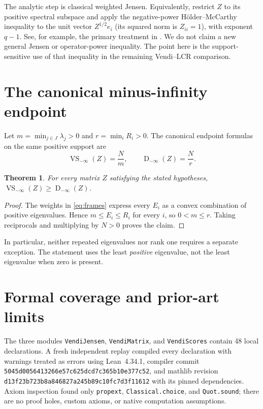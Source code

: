 \documentclass[11pt]{article}
\newtheorem{theorem}{Theorem}
\newcommand{\VS}{\operatorname{VS}}
\newcommand{\LCR}{\operatorname{D}}
\begin{document}
The analytic step is classical weighted Jensen. Equivalently, restrict
$Z$ to its positive spectral subspace and apply the negative-power
H\"older--McCarthy inequality to the unit vector $Z^{1/2}e_i$
(its squared norm is $Z_{ii}=1$), with exponent $q-1$.
See, for example, the primary treatment in \cite[Theorems~1--2]{Dragomir}.
We do not claim a new general Jensen or operator-power inequality.
The point here is the support-sensitive use of that inequality in the
remaining Vendi--LCR comparison.

\section{The canonical minus-infinity endpoint}
Let $m=\min_{j\in J}\lambda_j>0$ and $r=\min_i R_i>0$.
The canonical endpoint formulas on the same positive support are
\begin{equation}\label{eq:infinity}
 \VS_{-\infty}(Z)=\frac{N}{m},\qquad
 \LCR_{-\infty}(Z)=\frac{N}{r}.
\end{equation}
\begin{theorem}\label{thm:infinity}
For every matrix $Z$ satisfying the stated hypotheses,
$\VS_{-\infty}(Z)\geq\LCR_{-\infty}(Z)$.
\end{theorem}
\begin{proof}
The weights in \eqref{eq:frames} express every $E_i$ as a convex
combination of positive eigenvalues. Hence $m\leq E_i\leq R_i$ for
every $i$, so $0<m\leq r$. Taking reciprocals and multiplying by
$N>0$ proves the claim.
\end{proof}
In particular, neither repeated eigenvalues nor rank one requires a
separate exception. The statement uses the least \emph{positive}
eigenvalue, not the least eigenvalue when zero is present.

\section{Formal coverage and prior-art limits}
The three modules \texttt{VendiJensen}, \texttt{VendiMatrix}, and
\texttt{VendiScores} contain 48 local declarations. A fresh independent
replay compiled every declaration with warnings treated as errors using
Lean~4.34.1, compiler commit
\texttt{5045d0056413266e57c625dcd7c365b10e377c52}, and mathlib revision
\texttt{d13f23b723b8a846827a245b89c10fc7d3f11612} with its pinned
dependencies. Axiom inspection found only \texttt{propext},
\texttt{Classical.choice}, and \texttt{Quot.sound}; there are no proof
holes, custom axioms, or native computation assumptions.
\end{document}
